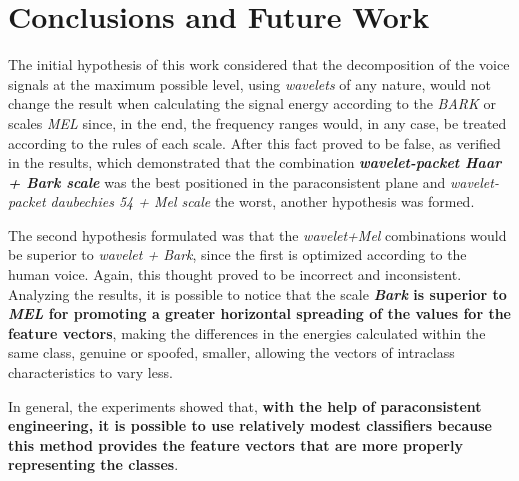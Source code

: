 \section{Conclusions and Future Work}
\label{sec:conclusions}
	\par The initial hypothesis of this work considered that the decomposition of the voice signals at the maximum possible level, using \textit{wavelets} of any nature, would not change the result when calculating the signal energy according to the \textit{BARK} or scales \textit{MEL} since, in the end, the frequency ranges would, in any case, be treated according to the rules of each scale. After this fact proved to be false, as verified in the results, which demonstrated that the combination \textbf{\textit{wavelet-packet Haar + Bark scale}} was the best positioned in the paraconsistent plane and \textit{wavelet-packet daubechies 54 + Mel scale} the worst, another hypothesis was formed.\\
	
	\par The second hypothesis formulated was that the \textit{wavelet+Mel} combinations would be superior to \textit{wavelet + Bark}, since the first is optimized according to the human voice. Again, this thought proved to be incorrect and inconsistent. Analyzing the results, it is possible to notice that the scale \textbf{\textit{Bark} is superior to \textit{MEL} for promoting a greater horizontal spreading of the values for the feature vectors}, making the differences in the energies calculated within the same class, genuine or spoofed, smaller, allowing the vectors of intraclass characteristics to vary less.\\
	
	\par In general, the experiments showed that, \textbf{with the help of  paraconsistent engineering, it is possible to use relatively modest classifiers because this method provides the feature vectors that are more properly representing the classes}.
	

